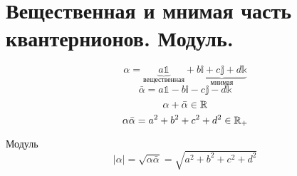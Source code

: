 \section{Вещественная и мнимая часть квантернионов. Модуль.}

$$\alpha=\underbrace{a\mathbb{1}}_{\text{вещественная}}+\underbrace{b\mathbb{i}+c\mathbb{j}+d\mathbb{k}}_{\text{мнимая}}$$
$$\bar\alpha=a\mathbb{1}-b\mathbb{i}-c\mathbb{j}-d\mathbb{k}$$
$$\alpha + \bar\alpha \in \mathbb{R}$$
$$\alpha\bar\alpha = a^2 + b^2 + c^2 + d^2 \in \mathbb{R}_+$$

\begin{Def}
Модуль
$$|\alpha| = \sqrt{\alpha \bar\alpha} = \sqrt{a^2 + b^2 + c^2 + d^2}$$
\end{Def}